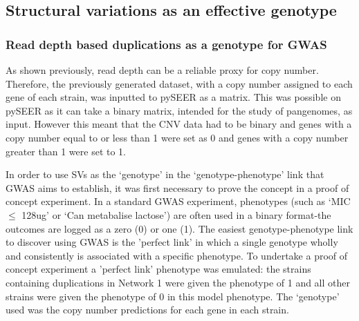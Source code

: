\documentclass{article}
\begin{document}
\subsection{Structural variations as an effective genotype}


\subsubsection{Read depth based duplications as a genotype for GWAS}

As shown previously, read depth can be a reliable proxy for copy number. Therefore, the previously generated dataset, with a copy number assigned to each gene of each strain, was inputted to pySEER as a matrix. This was possible on pySEER as it can take a binary matrix, intended for the study of pangenomes, as input. However this meant that the CNV data had to be binary and genes with a copy number equal to or less than 1 were set as 0 and genes with a copy number greater than 1 were set to 1.


In order to use SVs as the ‘genotype’ in the ‘genotype-phenotype’ link that GWAS aims to establish, it was first necessary to prove the concept in a proof of concept experiment. In a standard GWAS experiment, phenotypes (such as `MIC $\leq$ 128ug' or `Can metabalise lactose') are often used in a binary format-the outcomes are logged as a zero (0) or one (1). The easiest genotype-phenotype link to discover using GWAS is the 'perfect link' in which a single genotype wholly and consistently is associated with a specific phenotype. To undertake a proof of concept experiment a 'perfect link' phenotype was emulated: the strains containing duplications in Network 1 were given the phenotype of 1 and all other strains were given the phenotype of 0 in this model phenotype. The `genotype' used was the copy number predictions for each gene in each strain.
\end{document}
